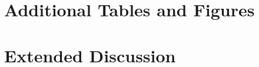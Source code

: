 \documentclass[10pt]{article}
\theoremstyle{plain-equal}
\begin{document}
\pagebreak
\begin{appendices}
\setcounter{table}{0}
\setcounter{figure}{0}
\renewcommand{\thetable}{A\arabic{table}}
\renewcommand{\thefigure}{A\arabic{figure}}
\setcounter{page}{1}
\renewcommand{\thepage}{A\arabic{page}}

\FloatBarrier
\section{Additional Tables and Figures}\label{app:additional}

\lipsum[19-20]

% 

\FloatBarrier
\section{Extended Discussion}\label{app:extended}

\lipsum[19-20]

\end{appendices}
\end{document}
